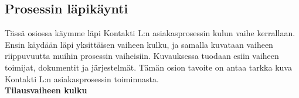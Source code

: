 \documentclass[finnish,12pt,a4paper,pdftex]{article}
\begin{document}



 





\subsection{Prosessin läpikäynti}

Tässä osiossa käymme läpi Kontakti L:n asiakasprosessin kulun vaihe kerrallaan. Ensin käydään läpi yksittäisen vaiheen kulku, ja samalla kuvataan vaiheen riippuvuutta muihin prosessin vaiheisiin. Kuvauksessa tuodaan esiin vaiheen toimijat, dokumentit ja järjestelmät. Tämän osion tavoite on antaa tarkka kuva Kontakti L:n asiakasprosessin toiminnasta. \\

\textbf{Tilausvaiheen kulku}\\

\end{document}
